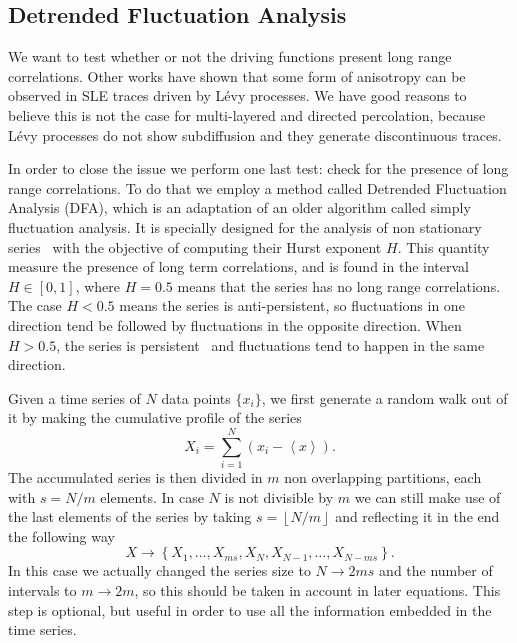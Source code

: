 \subsection{Detrended Fluctuation Analysis}
\label{sec:dfa}

We want to test whether or not the driving functions present long range
correlations. Other works have shown that some form of anisotropy can be
observed in SLE traces driven by L\'evy processes. We have good reasons to
believe this is not the case for multi-layered and directed percolation,
because L\'evy processes do not show subdiffusion and they generate
discontinuous traces.

In order to close the issue we perform one last test: check for the presence of
long range correlations. To do that we employ a method called Detrended
Fluctuation Analysis (DFA), which is an adaptation of an older
algorithm called simply fluctuation analysis. It is specially designed for the
analysis of non stationary series~\cite{Peng1993, Hardstone2012} with the
objective of computing their Hurst exponent $H$. This quantity measure the
presence of long term correlations, and is found in the interval $H\in[0,1]$,
where $H=0.5$ means that the series has no long range correlations. The case
$H<0.5$ means the series is anti-persistent, so fluctuations in one direction
tend be followed by fluctuations in the opposite direction. When $H>0.5$, the
series is persistent~\cite{Matos2008} and fluctuations tend to happen in the
same direction.

Given a time series of $N$ data points $\{x_i\}$, we first generate a random walk
out of it by making the cumulative profile of the series
\begin{equation}
    X_i = \sum_{i=1}^{N} \left({x_i - \left\langle x \right\rangle}\right).
\end{equation}
The accumulated series is then divided in $m$ non overlapping partitions, each with
$s = N/m$ elements. In case $N$ is not divisible by $m$ we can still make use
of the last elements of the series by taking $s=\left\lfloor N/m\right\rfloor$
and reflecting it in the end the following way
\begin{equation}
    X\rightarrow\left\{X_1, \ldots, X_{ms},
                       X_{N}, X_{N - 1}, \ldots,
                       X_{N - ms}\right\}.
\end{equation}
In this case we actually changed the series size to $N\rightarrow2ms$ and the
number of intervals to $m\rightarrow2m$, so this should be taken in account in
later equations. This step is optional, but useful in order to use all the
information embedded in the time series.


